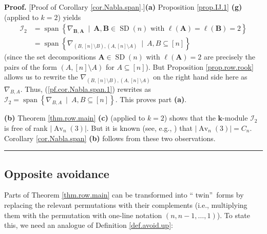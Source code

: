 \documentclass[numbers=enddot,12pt,final,onecolumn,notitlepage]{scrartcl}%
\numberwithin{exer}{subsection}
\theoremstyle{definition}
\newenvironment{proof}[1][Proof]{\noindent\textbf{#1.} }{\ \rule{0.5em}{0.5em}}
\begin{document}
\begin{proof}
[Proof of Corollary \ref{cor.Nabla.span}.]\textbf{(a)} Proposition
\ref{prop.IJ.1} \textbf{(g)} (applied to $k=2$) yields%
\begin{align}
\mathcal{I}_{2}  &  =\operatorname*{span}\left\{  \nabla_{\mathbf{B}%
,\mathbf{A}}\ \mid\ \mathbf{A},\mathbf{B}\in\operatorname*{SD}\left(
n\right)  \text{ with }\ell\left(  \mathbf{A}\right)  =\ell\left(
\mathbf{B}\right)  =2\right\} \nonumber\\
&  =\operatorname*{span}\left\{  \nabla_{\left(  B,\left[  n\right]  \setminus
B\right)  ,\left(  A,\left[  n\right]  \setminus A\right)  }\ \mid
\ A,B\subseteq\left[  n\right]  \right\}  \label{pf.cor.Nabla.span.1}%
\end{align}
(since the set decompositions $\mathbf{A}\in\operatorname*{SD}\left(
n\right)  $ with $\ell\left(  \mathbf{A}\right)  =2$ are precisely the pairs
of the form $\left(  A,\left[  n\right]  \setminus A\right)  $ for
$A\subseteq\left[  n\right]  $). But Proposition \ref{prop.row.rook} allows us
to rewrite the $\nabla_{\left(  B,\left[  n\right]  \setminus B\right)
,\left(  A,\left[  n\right]  \setminus A\right)  }$ on the right hand side
here as $\nabla_{B,A}$. Thus, (\ref{pf.cor.Nabla.span.1}) rewrites as
$\mathcal{I}_{2}=\operatorname*{span}\left\{  \nabla_{B,A}\ \mid
\ A,B\subseteq\left[  n\right]  \right\}  $. This proves part \textbf{(a)}.
\medskip

\textbf{(b)} Theorem \ref{thm.row.main} \textbf{(c)} (applied to $k=2$) shows
that the $\mathbf{k}$-module $\mathcal{I}_{2}$ is free of rank $\left\vert
\operatorname*{Av}\nolimits_{n}\left(  3\right)  \right\vert $. But it is
known (see, e.g., \cite[Corollary 4.8]{Bona22}) that $\left\vert
\operatorname*{Av}\nolimits_{n}\left(  3\right)  \right\vert =C_{n}$.
Corollary \ref{cor.Nabla.span} \textbf{(b)} follows from these two observations.
\end{proof}

\subsection{Opposite avoidance}

Parts of Theorem \ref{thm.row.main} can be transformed into \textquotedblleft
twin\textquotedblright\ forms by replacing the relevant permutations with
their complements (i.e., multiplying them with the permutation with one-line
notation $\left(  n,n-1,\ldots,1\right)  $). To state this, we need an
analogue of Definition \ref{def.avoid.up}:
\end{document}
